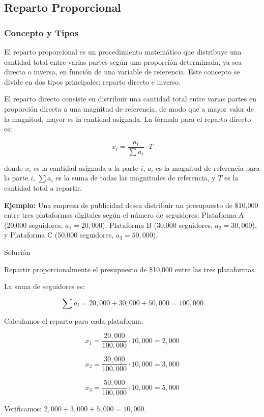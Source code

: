 \documentclass[
  stu,
  floatsintext,
  longtable,
  a4paper,
  nolmodern,
  notxfonts,
  notimes,
  colorlinks=true,linkcolor=blue,citecolor=blue,urlcolor=blue]{apa7}
\begin{document}
\subsection{Reparto Proporcional}\label{reparto-proporcional}

\subsubsection{Concepto y Tipos}\label{concepto-y-tipos}

El reparto proporcional es un procedimiento matemático que distribuye
una cantidad total entre varias partes según una proporción determinada,
ya sea directa o inversa, en función de una variable de referencia. Este
concepto se divide en dos tipos principales: reparto directo e inverso.

El reparto directo consiste en distribuir una cantidad total entre
varias partes en proporción directa a una magnitud de referencia, de
modo que a mayor valor de la magnitud, mayor es la cantidad asignada. La
fórmula para el reparto directo es:

\[
x_i = \frac{a_i}{\sum a_i} \cdot T
\]

donde \(x_i\) es la cantidad asignada a la parte \(i\), \(a_i\) es la
magnitud de referencia para la parte \(i\), \(\sum a_i\) es la suma de
todas las magnitudes de referencia, y \(T\) es la cantidad total a
repartir.

\textbf{Ejemplo:} Una empresa de publicidad desea distribuir un
presupuesto de \$10,000 entre tres plataformas digitales según el número
de seguidores: Plataforma A (20,000 seguidores, \(a_1 = 20,000\)),
Plataforma B (30,000 seguidores, \(a_2 = 30,000\)), y Plataforma C
(50,000 seguidores, \(a_3 = 50,000\)).

Solución

Repartir proporcionalmente el presupuesto de \$10,000 entre las tres
plataformas.

La suma de seguidores es:

\[
\sum a_i = 20,000 + 30,000 + 50,000 = 100,000
\]

Calculamos el reparto para cada plataforma:

\[
x_1 = \frac{20,000}{100,000} \cdot 10,000 = 2,000
\]

\[
x_2 = \frac{30,000}{100,000} \cdot 10,000 = 3,000
\]

\[
x_3 = \frac{50,000}{100,000} \cdot 10,000 = 5,000
\]

Verificamos: \(2,000 + 3,000 + 5,000 = 10,000\).
\end{document}
